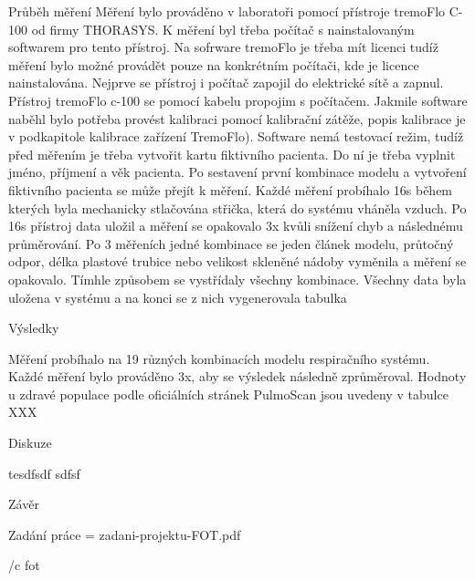 \sec Průběh měření
Měření bylo prováděno v laboratoři pomocí přístroje tremoFlo C-100 od firmy THORASYS. K měření byl třeba počítač s nainstalovaným softwarem pro tento přístroj. Na sofrware tremoFlo je třeba mít licenci tudíž měření bylo možné provádět pouze na konkrétním počítači, kde je licence nainstalována.  Nejprve se přístroj i počítač zapojil do elektrické sítě a zapnul. Přístroj tremoFlo c-100 se pomocí kabelu propojim s počítačem. Jakmile software naběhl bylo potřeba provést kalibraci pomocí kalibrační zátěže, popis kalibrace je v podkapitole kalibrace zařízení TremoFlo). Software nemá testovací režim, tudíž před měřením je třeba vytvořit kartu fiktivního pacienta. Do ní je třeba vyplnit  jméno, příjmení a věk pacienta. Po sestavení první kombinace modelu a vytvoření fiktivního pacienta se může přejít k měření. Každé měření probíhalo 16s během kterých byla mechanicky stlačována střička, která do systému vháněla vzduch. Po 16s přístroj data uložil a měření se opakovalo 3x kvůli snížení chyb a následnému průměrování. Po 3 měřeních jedné kombinace se jeden článek modelu, průtočný odpor, délka plastové trubice nebo velikost skleněné nádoby vyměnila a měření se opakovalo. Tímhle způsobem se vystřídaly všechny kombinace. Všechny data byla uložena v systému a na konci se z nich vygenerovala tabulka


\chap Výsledky


Měření probíhalo na 19 různých kombinacích modelu respiračního systému. Každé měření bylo prováděno 3x, aby se výsledek následně zprůměroval. 
Hodnoty u zdravé populace podle oficiálních stránek PulmoScan jsou uvedeny v tabulce XXX


\chap Diskuze


tesdfsdf \break
sdfsf

\chap Závěr



\app Zadání práce
\picw=\hsize %
\cinspic zadani-projektu-FOT.pdf


\bibchap
\usebbl/c fot


\bye
